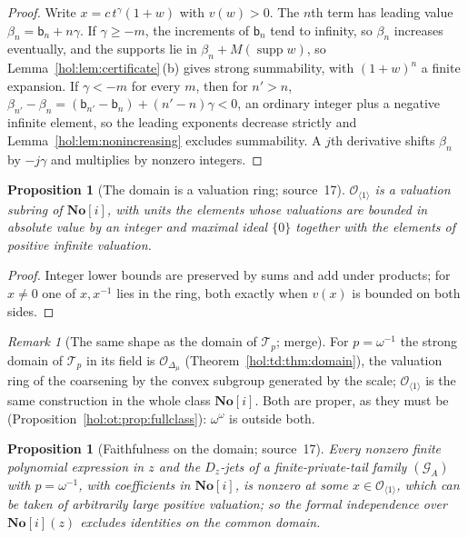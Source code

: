 \documentclass[11pt]{article}
\numberwithin{equation}{section}
\newtheorem{proposition}[theorem]{Proposition}
\theoremstyle{definition}
\theoremstyle{remark}
\newtheorem{remark}[theorem]{Remark}
\newcommand{\No}{\mathbf{No}}
\newcommand{\supp}{\operatorname{supp}}
\begin{document}
\begin{proof}
Write $x=c\,t^\gamma(1+w)$ with $v(w)>0$. The $n$th term has leading value
$\beta_n=\mathsf b_n+n\gamma$. If $\gamma\ge-m$, the increments of
$\mathsf b_n$ tend to infinity, so $\beta_n$ increases eventually, and the
supports lie in $\beta_n+M(\supp w)$, so Lemma~\ref{hol:lem:certificate}\,(b)
gives strong summability, with $(1+w)^n$ a finite expansion. If $\gamma<-m$
for every $m$, then for $n'>n$, $\beta_{n'}-\beta_n=(\mathsf b_{n'}-\mathsf b_n)
+(n'-n)\gamma<0$, an ordinary integer plus a negative infinite element, so the
leading exponents decrease strictly and Lemma~\ref{hol:lem:nonincreasing}
excludes summability. A $j$th derivative shifts $\beta_n$ by $-j\gamma$ and
multiplies by nonzero integers.
\end{proof}

\begin{proposition}[The domain is a valuation ring; source~17]
\label{hol:fh:prop:domainring}
$\mathcal O_{\langle1\rangle}$ is a valuation subring of $\No[i]$, with units the
elements whose valuations are bounded in absolute value by an integer and
maximal ideal $\{0\}$ together with the elements of positive infinite
valuation.
\end{proposition}

\begin{proof}
Integer lower bounds are preserved by sums and add under products; for $x\ne0$
one of $x,x^{-1}$ lies in the ring, both exactly when $v(x)$ is bounded on
both sides.
\end{proof}

\begin{remark}[The same shape as the domain of $\mathcal T_p$; merge]
\label{hol:fh:rem:domains}
For $p=\omega^{-1}$ the strong domain of $\mathcal T_p$ in its field is
$\mathcal O_{\Delta_\mu}$ (Theorem~\ref{hol:td:thm:domain}), the valuation ring of
the coarsening by the convex subgroup generated by the scale;
$\mathcal O_{\langle1\rangle}$ is the same construction in the whole class
$\No[i]$. Both are proper, as they must be
(Proposition~\ref{hol:ot:prop:fullclass}): $\omega^\omega$ is outside both.
\end{remark}

\begin{proposition}[Faithfulness on the domain; source~17]
\label{hol:fh:prop:faithful}
Every nonzero finite polynomial expression in $z$ and the $D_z$-jets of a
finite-private-tail family $(\mathcal G_A)$ with $p=\omega^{-1}$, with
coefficients in $\No[i]$, is nonzero at some $x\in\mathcal O_{\langle1\rangle}$,
which can be taken of arbitrarily large positive valuation; so the formal
independence over $\No[i](z)$ excludes identities on the common domain.
\end{proposition}
\end{document}
